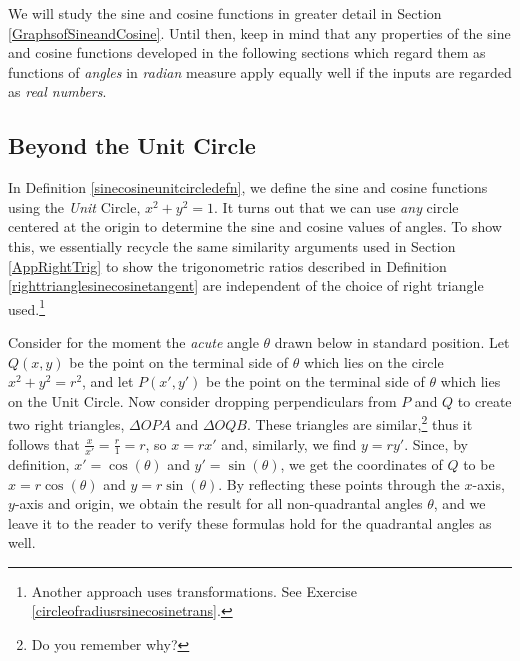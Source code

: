 \documentclass{ximera}
\begin{document}
We will study the sine and cosine functions in greater detail in Section \ref{GraphsofSineandCosine}.  Until then, keep in mind that any properties of the sine and cosine functions developed in the following sections which regard them as functions of \textit{angles} in \textit{radian} measure apply equally well if the inputs are regarded as \textit{real numbers}.




\subsection{Beyond the Unit Circle}
\label{cosinesinebeyond}

In Definition \ref{sinecosineunitcircledefn}, we define the sine and cosine functions using the \textit{Unit} Circle, $x^2+y^2=1$.   It turns out that we can use \textit{any} circle centered at the origin to determine the sine and cosine values of angles.  To show this,  we essentially recycle the same similarity arguments used in Section \ref{AppRightTrig} to show the trigonometric ratios described in Definition \ref{righttrianglesinecosinetangent} are independent of the choice of right triangle used.\footnote{Another approach uses transformations.  See Exercise \ref{circleofradiusrsinecosinetrans}.}



Consider for the moment the \textit{acute} angle $\theta$ drawn below in standard position.  Let $Q(x,y)$ be the point on the terminal side of $\theta$ which lies on the circle $x^2+y^2 = r^2$, and let $P(x',y')$ be the point on the terminal side of $\theta$ which lies on the Unit Circle.   Now consider dropping perpendiculars from $P$ and $Q$ to create two right triangles, $\Delta OPA$ and $\Delta OQB$. These triangles are similar,\footnote{Do you remember why?} thus it follows that $\frac{x}{x'} = \frac{r}{1} = r$, so $x = r x'$ and, similarly, we find $y = r y'$.  Since, by definition, $x' = \cos(\theta)$ and $y' = \sin(\theta)$,  we get the coordinates of $Q$ to be $x = r \cos(\theta)$ and $y = r \sin(\theta)$.  By reflecting these points through the $x$-axis, $y$-axis and origin, we obtain the result for all non-quadrantal angles $\theta$, and we leave it to the reader to verify these formulas hold for the quadrantal angles as well.
\end{document}
